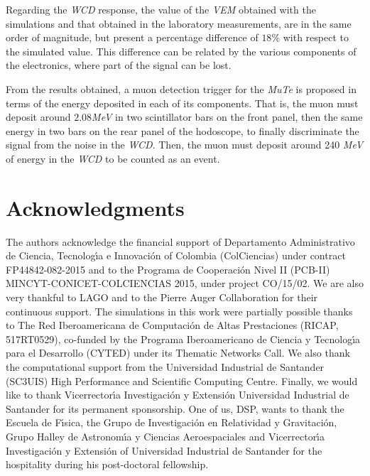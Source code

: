 \documentclass[submitting]{nst}
\begin{document}
Regarding the \textsl{WCD} response, the value of the \textsl{VEM} obtained with the simulations and that obtained in the laboratory measurements, are in the same order of magnitude, but present a percentage difference of $18$\% with respect to the simulated value. This difference can be related by the various components of the electronics, where part of the signal can be lost.

From the results obtained, a muon detection trigger for the \textsl{MuTe} is proposed in terms of the energy deposited in each of its components. That is, the muon must deposit around $2.08$\textsl{MeV} in two scintillator bars on the front panel, then the same energy in two bars on the rear panel of the hodoscope, to finally discriminate the signal from the noise in the \textsl{WCD}. Then, the muon must deposit around 240   \textsl{MeV}  of energy in the \textsl{WCD} to be counted as an event.


\section*{Acknowledgments}
The authors acknowledge the financial support of  Departamento Administrativo de Ciencia, Tecnolog\'{\i}a e Innovaci\'on of Colombia (ColCiencias) under contract FP44842-082-2015 and to the Programa de Cooperaci\'on Nivel II (PCB-II) MINCYT-CONICET-COLCIENCIAS 2015, under project CO/15/02.  We are also very thankful to LAGO and to the Pierre Auger Collaboration for their continuous support.  The simulations in this work were partially possible thanks to The Red Iberoamericana de Computaci\'on de Altas Prestaciones (RICAP, 517RT0529), co-funded by the Programa Iberoamericano de Ciencia y Tecnolog\'{\i}a para el Desarrollo (CYTED) under its Thematic Networks Call. We also thank the computational support from the Universidad Industrial de Santander (SC3UIS) High Performance and Scientific Computing Centre. Finally, we would like to thank Vicerrector\'{\i}a Investigaci\'on y Extensi\'on Universidad Industrial de Santander for its permanent sponsorship. One of us, DSP, wants to thank the Escuela de F\'{\i}sica, the Grupo de Investigaci\'on en Relatividad y Gravitaci\'on, Grupo Halley de Astronom\'{\i}a y Ciencias Aeroespaciales and Vicerrector\'{\i}a Investigaci\'on y Extensi\'on of Universidad Industrial de Santander for the hospitality during his post-doctoral fellowship.




\end{document}

